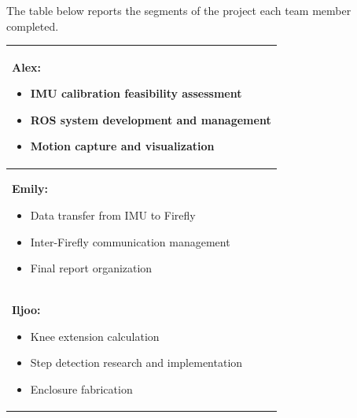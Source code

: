 \documentclass[conference]{IEEEtran}
\begin{document}
The table below reports the segments of the project each team member completed.\\
\begin{tabular}{|p{}|}
  \hline
{\bf Alex:}
\begin{itemize}
  \item {IMU calibration feasibility assessment}
  \item ROS system development and management
  \item Motion capture and visualization
\end{itemize}\tabularnewline
\hline
{\bf Emily:}
\begin{itemize}
  \item{Data transfer from IMU to Firefly}
  \item{Inter-Firefly communication management}
  \item{Final report organization} 
\end{itemize}\tabularnewline
\hline
{\bf Iljoo:}
\begin{itemize}
  \item{Knee extension calculation} 
  \item{Step detection research and implementation}
  \item{Enclosure fabrication} 
\end{itemize}\tabularnewline
  \hline
\end{tabular}

\balance

\end{document}
